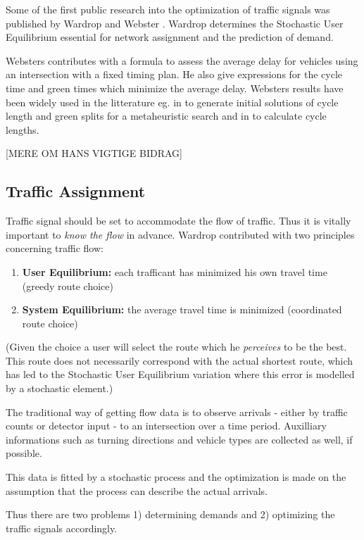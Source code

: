 \label{history}
Some of the first public research into the optimization of traffic signals was published by Wardrop \cite{Wardrop} and Webster \cite{Webster}. Wardrop determines the Stochastic User Equilibrium essential for network assignment and the prediction of demand. 

Websters contributes with a formula to assess the average delay for vehicles using an intersection with a fixed timing plan. He also give expressions for the cycle time and green times which minimize the average delay. 
Websters results have been widely used in the litterature eg. in \cite{1} to generate initial solutions of cycle length and green splits for a metaheuristic search and in \cite{30} to calculate cycle lengths.

[MERE OM HANS VIGTIGE BIDRAG]

\subsection{Traffic Assignment}
Traffic signal should be set to accommodate the flow of traffic. Thus it is vitally important to \textit{know the flow} in advance. Wardrop contributed with two principles concerning traffic flow:

\begin{enumerate}
\item \textbf{User Equilibrium:} each trafficant has minimized his own travel time (greedy route choice)
\item \textbf{System Equilibrium:} the average travel time is minimized (coordinated route choice)
\end{enumerate}

(Given the choice a user will select the route which he \textit{perceives} to be the best. This route does not necessarily correspond with the actual shortest route, which has led to the Stochastic User Equilibrium variation where this error is modelled by a stochastic element.)

The traditional way of getting flow data is to observe arrivals - either by traffic counts or detector input - to an intersection over a time period. Auxilliary informations such as turning directions and vehicle types are collected as well, if possible. 

This data is fitted by a stochastic process and the optimization is made on the assumption that the process can describe the actual arrivals.

Thus there are two problems 1) determining demands and 2) optimizing the traffic signals accordingly.

